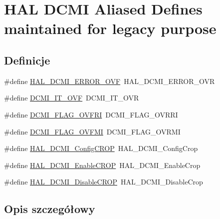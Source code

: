 \hypertarget{group___h_a_l___d_c_m_i___aliased___defines}{}\section{H\+AL D\+C\+MI Aliased Defines maintained for legacy purpose}
\label{group___h_a_l___d_c_m_i___aliased___defines}
\subsection*{Definicje}
\begin{DoxyCompactItemize}
\item 
\#define \hyperlink{group___h_a_l___d_c_m_i___aliased___defines_ga5aea0676cf18867facb28620b5818396}{H\+A\+L\+\_\+\+D\+C\+M\+I\+\_\+\+E\+R\+R\+O\+R\+\_\+\+O\+VF}~H\+A\+L\+\_\+\+D\+C\+M\+I\+\_\+\+E\+R\+R\+O\+R\+\_\+\+O\+VR
\item 
\#define \hyperlink{group___h_a_l___d_c_m_i___aliased___defines_ga5afbb2e1a8b64d9e042da18d8304667e}{D\+C\+M\+I\+\_\+\+I\+T\+\_\+\+O\+VF}~D\+C\+M\+I\+\_\+\+I\+T\+\_\+\+O\+VR
\item 
\#define \hyperlink{group___h_a_l___d_c_m_i___aliased___defines_ga10e986f24ca3e73d31f56ddd908987e0}{D\+C\+M\+I\+\_\+\+F\+L\+A\+G\+\_\+\+O\+V\+F\+RI}~D\+C\+M\+I\+\_\+\+F\+L\+A\+G\+\_\+\+O\+V\+R\+RI
\item 
\#define \hyperlink{group___h_a_l___d_c_m_i___aliased___defines_gaec0c82ddcc3994b877a2f904c680e2b1}{D\+C\+M\+I\+\_\+\+F\+L\+A\+G\+\_\+\+O\+V\+F\+MI}~D\+C\+M\+I\+\_\+\+F\+L\+A\+G\+\_\+\+O\+V\+R\+MI
\item 
\#define \hyperlink{group___h_a_l___d_c_m_i___aliased___defines_ga97e4484879b160cdbd78136b4bf00e4c}{H\+A\+L\+\_\+\+D\+C\+M\+I\+\_\+\+Config\+C\+R\+OP}~H\+A\+L\+\_\+\+D\+C\+M\+I\+\_\+\+Config\+Crop
\item 
\#define \hyperlink{group___h_a_l___d_c_m_i___aliased___defines_ga8503dfb94edec53caaa40b98e0853c82}{H\+A\+L\+\_\+\+D\+C\+M\+I\+\_\+\+Enable\+C\+R\+OP}~H\+A\+L\+\_\+\+D\+C\+M\+I\+\_\+\+Enable\+Crop
\item 
\#define \hyperlink{group___h_a_l___d_c_m_i___aliased___defines_ga508db44d186de33245decc10be6ab0f2}{H\+A\+L\+\_\+\+D\+C\+M\+I\+\_\+\+Disable\+C\+R\+OP}~H\+A\+L\+\_\+\+D\+C\+M\+I\+\_\+\+Disable\+Crop
\end{DoxyCompactItemize}


\subsection{Opis szczegółowy}


